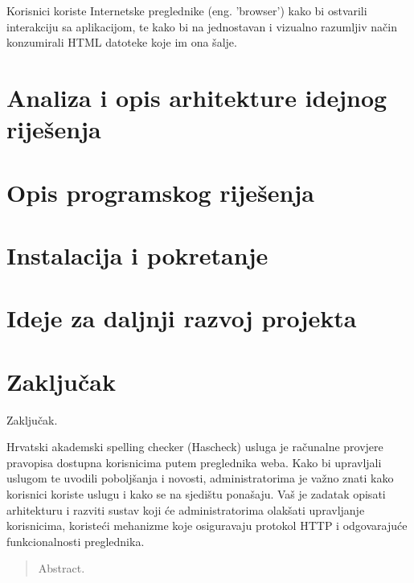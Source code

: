 \documentclass[times, utf8, zavrsni]{fer}
\begin{document}
Korisnici koriste Internetske preglednike (eng. 'browser') kako bi ostvarili
interakciju sa aplikacijom, te kako bi na jednostavan i vizualno razumljiv način
konzumirali HTML datoteke koje im ona šalje.

\chapter{Analiza i opis arhitekture idejnog riješenja}

\chapter{Opis programskog riješenja}

\chapter{Instalacija i pokretanje}

\chapter{Ideje za daljnji razvoj projekta}

\chapter{Zaključak}
Zaključak.




\begin{sazetak}
Hrvatski akademski spelling checker (Hascheck) usluga je računalne provjere
pravopisa dostupna korisnicima putem preglednika weba. Kako bi upravljali
uslugom te uvodili poboljšanja i novosti, administratorima je važno znati
kako korisnici koriste uslugu i kako se na sjedištu ponašaju. Vaš je zadatak
opisati arhitekturu i razviti sustav koji će administratorima olakšati
upravljanje korisnicima, koristeći mehanizme koje osiguravaju protokol HTTP i
odgovarajuće funkcionalnosti preglednika.

\end{sazetak}

\begin{abstract}
Abstract.

\end{abstract}
\end{document}
